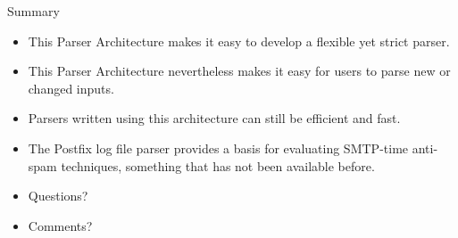 \documentclass{beamer}
\newcommand{\timingnote}[1]{%
}
\begin{document}
\begin{frame}{Summary}

    \timingnote{1 minute}

    \begin{itemize}

        \item This Parser Architecture makes it easy to develop a flexible
            yet strict parser.

        \item This Parser Architecture nevertheless makes it easy for users
            to parse new or changed inputs.

        \item Parsers written using this architecture can still be
            efficient and fast.

        \item The Postfix log file parser provides a basis for evaluating
            SMTP-time anti-spam techniques, something that has not been
            available before.

    \end{itemize}

    \timingnote{remainder}

    \begin{itemize}

        \item Questions?

        \item Comments?

    \end{itemize}

\end{frame}
\end{document}
